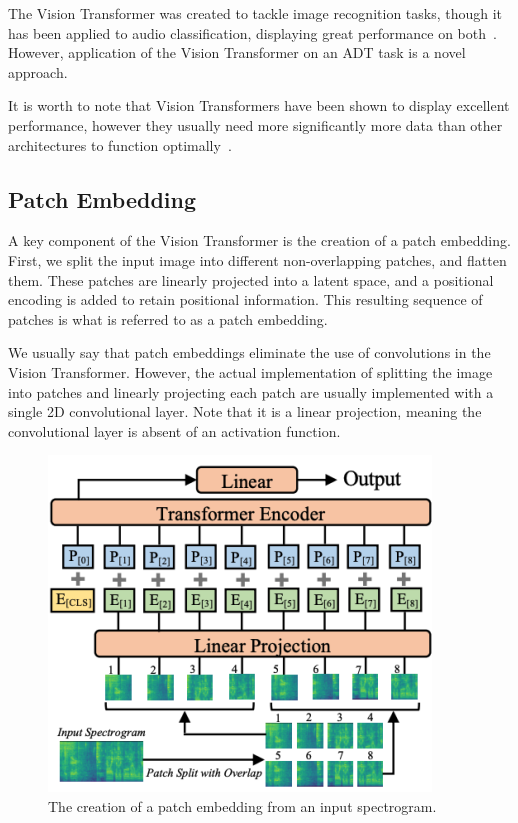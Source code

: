 The Vision Transformer was created to tackle image recognition tasks, though it has been applied to audio classification, displaying great performance on both~\cite{dosovitskiy2021imageworth16x16words, gong2021astaudiospectrogramtransformer}. However, application of the Vision Transformer on an \gls{ADT} task is a novel approach.

It is worth to note that Vision Transformers have been shown to display excellent performance, however they usually need more significantly more data than other architectures to function optimally~\cite{dosovitskiy2021imageworth16x16words}.

\subsection{Patch Embedding}

A key component of the Vision Transformer is the creation of a patch embedding. First, we split the input image into different non-overlapping patches, and flatten them. These patches are linearly projected into a latent space, and a positional encoding is added to retain positional information. This resulting sequence of patches is what is referred to as a patch embedding.

We usually say that patch embeddings eliminate the use of convolutions in the Vision Transformer. However, the actual implementation of splitting the image into patches and linearly projecting each patch are usually implemented with a single 2D convolutional layer. Note that it is a linear projection, meaning the convolutional layer is absent of an activation function.

\begin{figure}[H]
    \centering
    \includegraphics[trim=0 0 0 132, clip, scale=0.7]{figures/patchembedding.png}
    \caption{The creation of a patch embedding from an input spectrogram.}
    \label{PatchEmbeddingFigure}
\end{figure}

